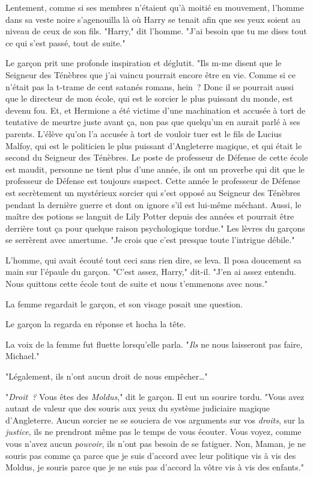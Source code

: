 Lentement, comme si ses membres n'étaient qu'à moitié en mouvement, l'homme dans sa veste noire s'agenouilla là où Harry se tenait afin que ses yeux soient au niveau de ceux de son fils. "Harry," dit l'homme. "J'ai besoin que tu me dises tout ce qui s'est passé, tout de suite."

Le garçon prit une profonde inspiration et déglutit. "Ils m-me disent que le Seigneur des Ténèbres que j'ai vaincu pourrait encore être en vie. Comme si ce n'était pas la t-trame de cent satanés romans, hein~? Donc il se pourrait aussi que le directeur de mon école, qui est le sorcier le plus puissant du monde, est devenu fou. Et, et Hermione a été victime d'une machination et accusée à tort de tentative de meurtre juste avant ça, non pas que quelqu'un en aurait parlé à ses parents. L'élève qu'on l'a accusée à tort de vouloir tuer est le fils de Lucius Malfoy, qui est le politicien le plus puissant d'Angleterre magique, et qui était le second du Seigneur des Ténèbres. Le poste de professeur de Défense de cette école est maudit, personne ne tient plus d'une année, ils ont un proverbe qui dit que le professeur de Défense est toujours suspect. Cette année le professeur de Défense est secrètement un mystérieux sorcier qui s'est opposé au Seigneur des Ténèbres pendant la dernière guerre et dont on ignore s'il est lui-même méchant. Aussi, le maître des potions se languit de Lily Potter depuis des années et pourrait être derrière tout ça pour quelque raison psychologique tordue." Les lèvres du garçons se serrèrent avec amertume. "Je crois que c'est presque toute l'intrigue débile."

L'homme, qui avait écouté tout ceci sans rien dire, se leva. Il posa doucement sa main sur l'épaule du garçon. "C'est assez, Harry," dit-il. "J'en ai assez entendu. Nous quittons cette école tout de suite et nous t'emmenons avec nous."

La femme regardait le garçon, et son visage posait une question.

Le garçon la regarda en réponse et hocha la tête.

La voix de la femme fut fluette lorsqu'elle parla. "\emph{Ils} ne nous laisseront pas faire, Michael."

"Légalement, ils n'ont aucun droit de nous empêcher…"

"\emph{Droit~?} Vous êtes des \emph{Moldus}," dit le garçon. Il eut un sourire tordu. "Vous avez autant de valeur que des souris aux yeux du système judiciaire magique d'Angleterre. Aucun sorcier ne se souciera de vos arguments sur vos \emph{droits}, sur la \emph{justice}, ils ne prendront même pas le temps de vous écouter. Vous voyez, comme vous n'avez aucun \emph{pouvoir}, ils n'ont pas besoin de se fatiguer. Non, Maman, je ne souris pas comme ça parce que je suis d'accord avec leur politique vis à vis des Moldus, je souris parce que je ne suis pas d'accord la vôtre vis à vis des enfants."

